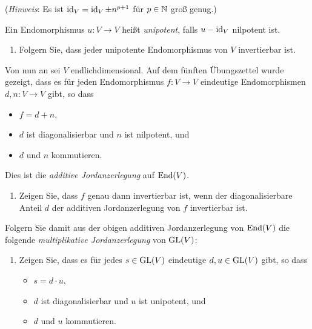 \begin{question}[subtitle = Die multiplikative Jordanzerlegung]{4}
\begin{enumerate}[leftmargin=*]
      (\emph{Hinweis}: Es ist $\operatorname{id}_V = \operatorname{id}_V \pm n^{p+1}$ für $p \in \mathbb{N}$ groß genug.)
  \end{enumerate}
  Ein Endomorphismus $u \colon V \to V$ heißt \emph{unipotent}, falls $u - \operatorname{id}_V$ nilpotent ist.
  \begin{enumerate}[leftmargin=*, resume]
    \item
      Folgern Sie, dass jeder unipotente Endomorphismus von $V$ invertierbar ist.
  \end{enumerate}
  Von nun an sei $V$ endlichdimensional.
  Auf dem fünften Übungszettel wurde gezeigt, dass es für jeden Endomorphismus $f \colon V \to V$ eindeutige Endomorphismen $d,n \colon V \to V$ gibt, so dass
  \begin{itemize}
    \item 
      $f = d + n$,
    \item
      $d$ ist diagonalisierbar und $n$ ist nilpotent, und
    \item
      $d$ und $n$ kommutieren.
  \end{itemize}
  Dies ist die \emph{additive Jordanzerlegung} auf $\operatorname{End}(V)$.
  \begin{enumerate}[leftmargin=*, resume]
    \item
      Zeigen Sie, dass $f$ genau dann invertierbar ist, wenn der diagonalisierbare Anteil $d$ der additiven Jordanzerlegung von $f$ invertierbar ist.
  \end{enumerate}
  Folgern Sie damit aus der obigen additiven Jordanzerlegung von $\operatorname{End}(V)$ die folgende \emph{multiplikative Jordanzerlegung} von $\operatorname{GL}(V)$:
  \begin{enumerate}[leftmargin=*, resume]
    \item
      Zeigen Sie, dass es für jedes $s \in \operatorname{GL}(V)$ eindeutige $d, u \in \operatorname{GL}(V)$ gibt, so dass
      \begin{itemize}
        \item
          $s = d \cdot u$,
        \item
          $d$ ist diagonalisierbar und $u$ ist unipotent, und
        \item
          $d$ und $u$ kommutieren.
      \end{itemize}
  \end{enumerate}
\end{question}



